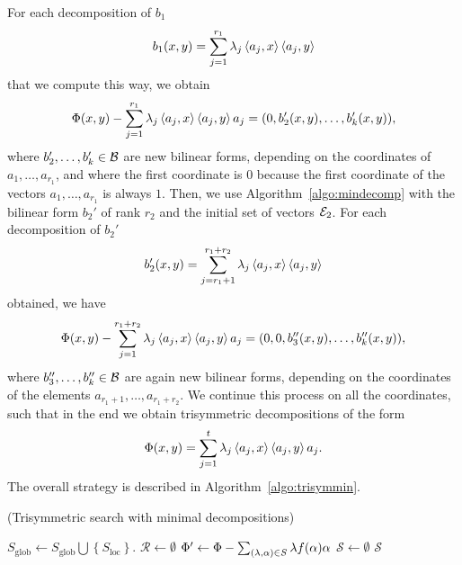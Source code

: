 For each decomposition of $b_1$
\[
  b_1(x, y) = \sum_{j=1}^{r_1}\lambda_j\left\langle a_j,x\right\rangle\left\langle a_j,y\right\rangle
\]
that we compute this way, we obtain
\[
  \Phi(x, y) - \sum_{j=1}^{r_1}\lambda_j\left\langle a_j,x\right\rangle\left\langle a_j,y\right\rangle a_j = (0, b_2'(x,
  y), \dots, b_k'(x, y)),
\]
where $b_2', \dots, b_k'\in\mathcal{B}$ are new bilinear forms, depending on the coordinates
of $a_1, \dots, a_{r_1}$, and where the first coordinate is $0$ because the
first coordinate of the vectors $a_1, \dots, a_{r_1}$ is always $1$. Then, we
use Algorithm~\ref{algo:mindecomp} with the bilinear form $b_2'$ of rank $r_2$ and the initial
set of vectors $\mathcal{E}_2$. For each decomposition of $b_2'$
\[
  b_2'(x, y) = \sum_{j=r_{1}+1}^{r_1+r_2}\lambda_j\left\langle a_j,x\right\rangle\left\langle a_j,y\right\rangle
\]
obtained, we have
\[
  \Phi(x, y) - \sum_{j=1}^{r_1+r_2}\lambda_j\left\langle a_j,x\right\rangle\left\langle a_j,y\right\rangle a_j = (0, 0,
  b_3''(x, y), \dots, b_k''(x, y)),
\]
where $b_3'', \dots, b_k''\in\mathcal{B}$ are again new bilinear forms, depending on the
coordinates of the elements $a_{r_1+1}, \dots, a_{r_1+r_2}$. We continue this
process on all the coordinates, such that in the end we obtain trisymmetric
decompositions of the form
\[
  \Phi(x, y) = \sum_{j=1}^t\lambda_j\left\langle a_j,x\right\rangle\left\langle a_j,y\right\rangle a_j.
\]
The overall strategy is described in Algorithm~\ref{algo:trisymmin}.
\begin{algorithm}
  \caption{(Trisymmetric search with minimal
  decompositions)}\label{algo:trisymmin}
  \begin{algorithmic}[1]

      \State $S_\text{glob}\gets S_\text{glob}\bigcup \left\{S_\text{loc}\right\}$.
        \State $\mathcal R\gets\emptyset$
        \State {}
        \State $\Phi'\gets\Phi-\sum_{(\lambda, \alpha)\in
        S}\lambda f(\alpha)\alpha$
        \State {}
        \EndFor
      \EndIf
    \EndProcedure
    \State $\mathcal S\gets\emptyset$
    \State {}
    \State \Return $\mathcal S$
  \end{algorithmic}
\end{algorithm}

